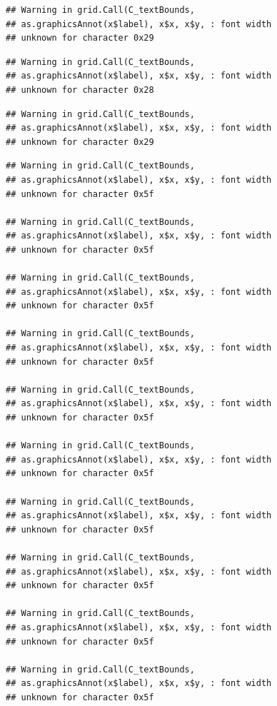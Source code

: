 \documentclass[
]{book}
\begin{document}
\begin{verbatim}
## Warning in grid.Call(C_textBounds,
## as.graphicsAnnot(x$label), x$x, x$y, : font width
## unknown for character 0x29
\end{verbatim}

\begin{verbatim}
## Warning in grid.Call(C_textBounds,
## as.graphicsAnnot(x$label), x$x, x$y, : font width
## unknown for character 0x28
\end{verbatim}

\begin{verbatim}
## Warning in grid.Call(C_textBounds,
## as.graphicsAnnot(x$label), x$x, x$y, : font width
## unknown for character 0x29
\end{verbatim}

\begin{verbatim}
## Warning in grid.Call(C_textBounds,
## as.graphicsAnnot(x$label), x$x, x$y, : font width
## unknown for character 0x5f

## Warning in grid.Call(C_textBounds,
## as.graphicsAnnot(x$label), x$x, x$y, : font width
## unknown for character 0x5f

## Warning in grid.Call(C_textBounds,
## as.graphicsAnnot(x$label), x$x, x$y, : font width
## unknown for character 0x5f

## Warning in grid.Call(C_textBounds,
## as.graphicsAnnot(x$label), x$x, x$y, : font width
## unknown for character 0x5f

## Warning in grid.Call(C_textBounds,
## as.graphicsAnnot(x$label), x$x, x$y, : font width
## unknown for character 0x5f

## Warning in grid.Call(C_textBounds,
## as.graphicsAnnot(x$label), x$x, x$y, : font width
## unknown for character 0x5f

## Warning in grid.Call(C_textBounds,
## as.graphicsAnnot(x$label), x$x, x$y, : font width
## unknown for character 0x5f

## Warning in grid.Call(C_textBounds,
## as.graphicsAnnot(x$label), x$x, x$y, : font width
## unknown for character 0x5f

## Warning in grid.Call(C_textBounds,
## as.graphicsAnnot(x$label), x$x, x$y, : font width
## unknown for character 0x5f

## Warning in grid.Call(C_textBounds,
## as.graphicsAnnot(x$label), x$x, x$y, : font width
## unknown for character 0x5f
\end{verbatim}
\end{document}
